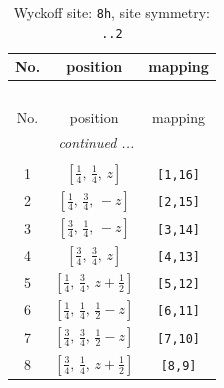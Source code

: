 \documentclass[fleqn,8pt]{jsarticle}
\begin{document}
\begin{longtable}{ccc}
\caption{Wyckoff site: {\tt 8h}, site symmetry: {\tt ..2}}
 \\
 \hline \hline
No. & position & mapping \\ \hline \endfirsthead

\multicolumn{2}{l}{\tablename\ \thetable{}} \\
 \hline \hline
No. & position & mapping \\ \hline \endhead

 \hline \hline
\multicolumn{2}{r}{\footnotesize\it continued ...} \\ \endfoot

 \hline \hline
\multicolumn{2}{r}{} \\ \endlastfoot

1 & $\left[ \frac{1}{4},\, \frac{1}{4},\, z \right]$ & {\tt [1,16]} \\ \hline
2 & $\left[ \frac{1}{4},\, \frac{3}{4},\, - z \right]$ & {\tt [2,15]} \\ \hline
3 & $\left[ \frac{3}{4},\, \frac{1}{4},\, - z \right]$ & {\tt [3,14]} \\ \hline
4 & $\left[ \frac{3}{4},\, \frac{3}{4},\, z \right]$ & {\tt [4,13]} \\ \hline
5 & $\left[ \frac{1}{4},\, \frac{3}{4},\, z + \frac{1}{2} \right]$ & {\tt [5,12]} \\ \hline
6 & $\left[ \frac{1}{4},\, \frac{1}{4},\, \frac{1}{2} - z \right]$ & {\tt [6,11]} \\ \hline
7 & $\left[ \frac{3}{4},\, \frac{3}{4},\, \frac{1}{2} - z \right]$ & {\tt [7,10]} \\ \hline
8 & $\left[ \frac{3}{4},\, \frac{1}{4},\, z + \frac{1}{2} \right]$ & {\tt [8,9]} \\
\end{longtable}
\renewcommand{\arraystretch}{1.2}
\end{document}
